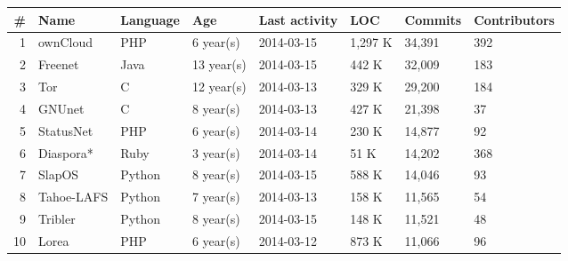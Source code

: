 \begin{tabular}[p]{| r | l | p{2.2cm} | p{1.2cm} | p{2.2cm} | p{1.2cm} | p{1.5cm} | p{2.3cm} |}
	\hline
	\textbf{\#} & \textbf{Name} & \textbf{Language} & \textbf{Age} & \textbf{Last activity} & \textbf{LOC} & \textbf{Commits} & \textbf{Contributors} \\ \hline

	1 & ownCloud & PHP & 6 year(s) & 2014-03-15 & 1,297 K & 34,391 & 392 \\ \hline
	2 & Freenet & Java & 13 year(s) & 2014-03-15 & 442 K & 32,009 & 183 \\ \hline
	3 & Tor & C & 12 year(s) & 2014-03-13 & 329 K & 29,200 & 184 \\ \hline
	4 & GNUnet & C & 8 year(s) & 2014-03-13 & 427 K & 21,398 & 37 \\ \hline
	5 & StatusNet & PHP & 6 year(s) & 2014-03-14 & 230 K & 14,877 & 92 \\ \hline
	6 & Diaspora* & Ruby & 3 year(s) & 2014-03-14 & 51 K & 14,202 & 368 \\ \hline
	7 & SlapOS & Python & 8 year(s) & 2014-03-15 & 588 K & 14,046 & 93 \\ \hline
	8 &Tahoe-LAFS & Python & 7 year(s) & 2014-03-13 & 158 K & 11,565 & 54 \\ \hline
	9 & Tribler & Python & 8 year(s) & 2014-03-15 & 148 K & 11,521 & 48 \\ \hline
	10 & Lorea & PHP & 6 year(s) & 2014-03-12 & 873 K & 11,066 & 96 \\ \hline
\end{tabular}
